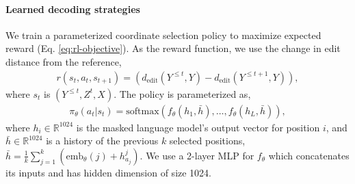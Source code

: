 \documentclass{article}
\newcommand{\alert}[1]{\textcolor{red}{TODO: #1}}
\newcommand{\red}[1]{\textcolor{red}{#1}}
\begin{document}




\paragraph{Learned decoding strategies}

We train a parameterized coordinate selection policy to maximize expected reward (Eq. \ref{eq:rl-objective}). As the reward function, we use the change in edit distance from the reference,
\begin{align*}
    r(s_t,a_t,s_{t+1})=(d_{\text{edit}}(Y^{\leq t},Y) - d_{\text{edit}}(Y^{\leq{t+1}},Y)),
\end{align*} 
where $s_t$ is $(Y^{\leq t},Z^t,X)$. The policy is parameterized as,
\begin{align*}
    \pi_{\theta}(a_t|s_t)=\text{softmax}\left(f_{\theta}(h_1, \bar{h}),\ldots,f_{\theta}(h_L, \bar{h})\right),
\end{align*}
where $h_i\in\mathbb{R}^{1024}$ is the masked language model's output vector for position $i$, and $\bar{h}\in\mathbb{R}^{1024}$ is a history of the previous $k$ selected positions, $\bar{h}=\frac{1}{k}\sum_{j=1}^k (\text{emb}_{\theta}(j)+h^{j}_{a_j})$. 
We use a 2-layer MLP for $f_{\theta}$ which concatenates its inputs and has hidden dimension of size 1024.
\end{document}
